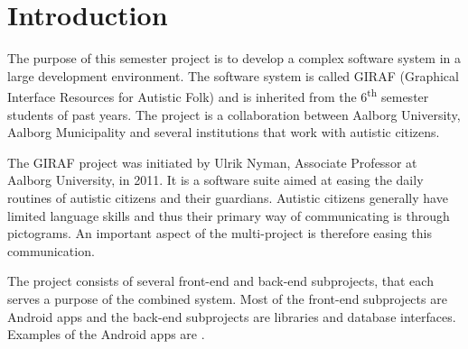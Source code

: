 \chapter{Introduction}
The purpose of this semester project is to develop a complex software system in a large development environment. The software system is called GIRAF (Graphical Interface Resources for Autistic Folk) and is inherited from the 6\textsuperscript{th} semester students of past years. The project is a collaboration between Aalborg University, Aalborg Municipality and several institutions that work with autistic citizens. 
 

The GIRAF project was initiated by Ulrik Nyman, Associate Professor at Aalborg University, in 2011. It is a software suite aimed at easing the daily routines of autistic citizens and their guardians. Autistic citizens generally have limited language skills and thus their primary way of communicating is through pictograms. An important aspect of the multi-project is therefore easing this communication.

The project consists of several front-end and back-end subprojects, that each serves a purpose of the combined system. Most of the front-end subprojects are Android apps and the back-end subprojects are libraries and database interfaces. Examples of the Android apps are .


